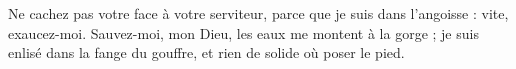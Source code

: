 Ne cachez pas votre face à votre serviteur, parce que je suis dans l’angoisse : vite, exaucez-moi.
\versseparator
Sauvez-moi, mon Dieu, les eaux me montent à la gorge ; je suis enlisé dans la fange du gouffre, et rien de solide où poser le pied.